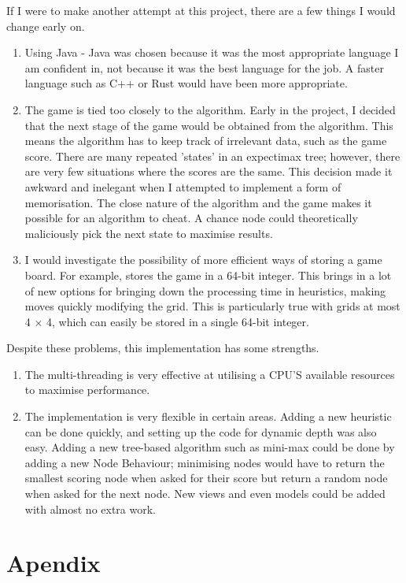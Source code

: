 \documentclass{article}
\begin{document}
If I were to make another attempt at this project, there are a few things I would change early on.
\begin{enumerate}
    \item Using Java - Java was chosen because it was the most appropriate language I am confident in, not because it was the best language for the job. A faster language such as C++ or Rust would have been more appropriate.
    \item The game is tied too closely to the algorithm. Early in the project, I decided that the next stage of the game would be obtained from the algorithm. This means the algorithm has to keep track of irrelevant data, such as the game score. There are many repeated 'states' in an expectimax tree; however, there are very few situations where the scores are the same. This decision made it awkward and inelegant when I attempted to implement a form of memorisation. The close nature of the algorithm and the game makes it possible for an algorithm to cheat. A chance node could theoretically maliciously pick the next state to maximise results.
    \item I would investigate the possibility of more efficient ways of storing a game board. For example, \cite{_16k2048ai} stores the game in a 64-bit integer. This brings in a lot of new options for bringing down the processing time in heuristics, making moves quickly modifying the grid. This is particularly true with grids at most 4 × 4, which can easily be stored in a single 64-bit integer.
\end{enumerate}
Despite these problems, this implementation has some strengths.
\begin{enumerate}
    \item The multi-threading is very effective at utilising a CPU'S available resources to maximise performance.
    \item The implementation is very flexible in certain areas. Adding a new heuristic can be done quickly, and setting up the code for dynamic depth was also easy. Adding a new tree-based algorithm such as mini-max could be done by adding a new Node Behaviour; minimising nodes would have to return the smallest scoring node when asked for their score but return a random node when asked for the next node. New views and even models could be added with almost no extra work.
\end{enumerate}
\newpage
\appendix
\section*{Apendix}
\end{document}
